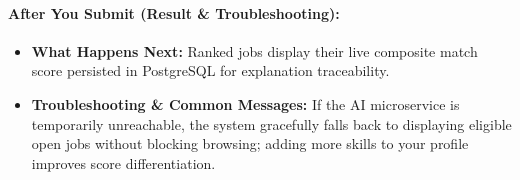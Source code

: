 \paragraph{After You Submit (Result \& Troubleshooting):}
\begin{itemize}[leftmargin=1.5em,itemsep=2pt]
  \item \textbf{What Happens Next:} Ranked jobs display their live composite match score persisted in PostgreSQL for explanation traceability.
  \item \textbf{Troubleshooting \& Common Messages:} If the AI microservice is temporarily unreachable, the system gracefully falls back to displaying eligible open jobs without blocking browsing; adding more skills to your profile improves score differentiation.
\end{itemize}
